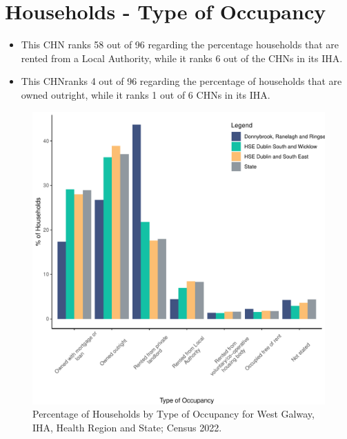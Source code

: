 \documentclass{article}
\begin{document}
\section{Households - Type of Occupancy}\label{sect:Households}
\begin{itemize}
\item This CHN ranks  58 out of 96 regarding the percentage households that are rented from a Local Authority, while it ranks  6 out of the CHNs in its IHA. 
\item This CHNranks  4 out of 96 regarding the percentage of households that are owned outright, while it ranks   1 out of 6 CHNs in its IHA.
\end{itemize}
\begin{figure}[H]
	\centering
	\includegraphics[width = 140mm]{../figures/HouseholdsED.pdf}
	\caption{Percentage of Households by Type of Occupancy for West Galway, IHA, Health Region and State; Census 2022.}
	\label{fig:vbnv}
	\end{figure}
\end{document}
